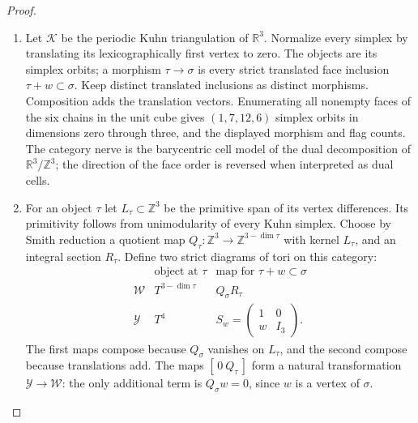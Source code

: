 \begin{proof}
\begin{enumerate}[label=\arabic*.]
\item Let $\mathcal K$ be the periodic Kuhn triangulation of
$\mathbb R^3$.  Normalize every simplex by translating its
lexicographically first vertex to zero.  The objects are its
simplex orbits; a morphism $\tau\to\sigma$ is every strict
translated face inclusion $\tau+w\subset\sigma$.
Keep distinct translated inclusions as distinct morphisms.
Composition adds the translation vectors.  Enumerating all
nonempty faces of the six chains in the unit cube gives
$(1,7,12,6)$ simplex orbits in dimensions zero through three,
and the displayed morphism and flag counts.  The category
nerve is the barycentric cell model of the dual decomposition
of $\mathbb R^3/\mathbb Z^3$; the direction of the face order
is reversed when interpreted as dual cells.

\item For an object $\tau$ let $L_\tau\subset\mathbb Z^3$ be the
primitive span of its vertex differences.  Its primitivity
follows from unimodularity of every Kuhn simplex.  Choose by
Smith reduction a quotient map
$Q_\tau:\mathbb Z^3\to\mathbb Z^{3-\dim\tau}$ with kernel
$L_\tau$, and an integral section $R_\tau$.
Define two strict diagrams of tori on this category:
\[
\begin{array}{c|c|c}
 &\text{object at }\tau&\text{map for }\tau+w\subset\sigma\\\hline
\mathcal W&T^{3-\dim\tau}&Q_\sigma R_\tau\\
\mathcal Y&T^4&S_w=\begin{pmatrix}1&0\\ w&I_3\end{pmatrix}.
\end{array}                                                \tag{F.CK2}\label{maps:eq:F.CK2}
\]
The first maps compose because $Q_\sigma$ vanishes on
$L_\tau$, and the second compose because translations add.
The maps $[\,0\ Q_\tau\,]$ form a natural transformation
$\mathcal Y\to\mathcal W$: the only additional term is
$Q_\sigma w=0$, since $w$ is a vertex of $\sigma$.


\end{enumerate}
\end{proof}
